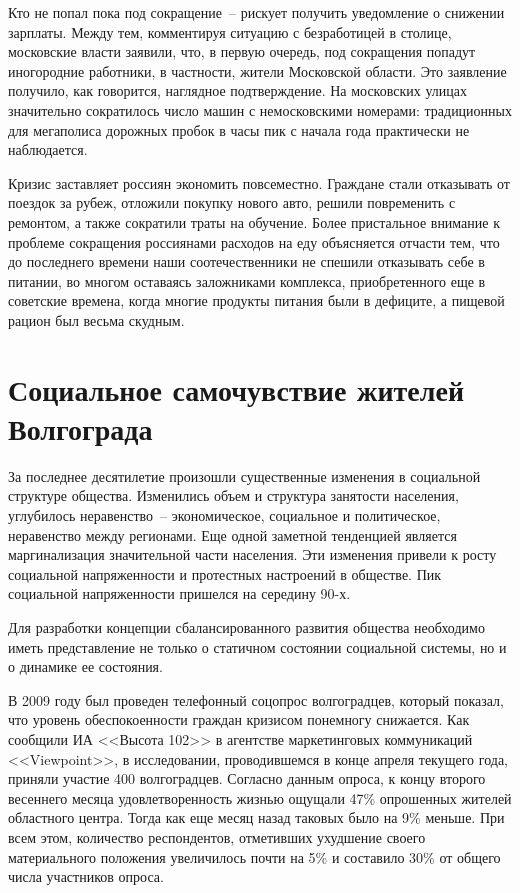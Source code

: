   Кто не попал пока под сокращение~-- рискует получить уведомление о снижении
  зарплаты. Между тем, комментируя ситуацию с безработицей в столице, московские
  власти заявили, что, в первую очередь, под сокращения попадут иногородние
  работники, в частности, жители Московской области. Это заявление получило, как
  говорится, наглядное подтверждение. На московских улицах значительно
  сократилось число машин с немосковскими номерами: традиционных для мегаполиса
  дорожных пробок в часы пик с начала года практически не наблюдается.
  
  Кризис заставляет россиян экономить повсеместно. Граждане стали отказывать от
  поездок за рубеж, отложили покупку нового авто, решили повременить с ремонтом,
  а также сократили траты на обучение. Более пристальное внимание к проблеме
  сокращения россиянами расходов на еду объясняется отчасти тем, что до
  последнего времени наши соотечественники не спешили отказывать себе в питании,
  во многом оставаясь заложниками комплекса, приобретенного еще в советские
  времена, когда многие продукты питания были в дефиците, а пищевой рацион был
  весьма скудным.
  
  \section{Социальное самочувствие жителей Волгограда}

  За последнее десятилетие произошли существенные изменения в социальной
  структуре общества. Изменились объем и структура занятости населения,
  углубилось неравенство~-- экономическое, социальное и политическое,
  неравенство между регионами. Еще одной заметной тенденцией является
  маргинализация значительной части населения. Эти изменения привели к росту
  социальной напряженности и протестных настроений в обществе. Пик социальной
  напряженности пришелся на середину 90-х.
    
  Для разработки концепции сбалансированного развития общества необходимо иметь
  представление не только о статичном состоянии социальной системы, но и о
  динамике ее состояния.
  
  В 2009 году был проведен телефонный соцопрос волгоградцев, который показал,
  что уровень обеспокоенности граждан кризисом понемногу снижается. Как сообщили
  ИА <<Высота 102>> в агентстве маркетинговых коммуникаций <<Viewpoint>>, в
  исследовании, проводившемся в конце апреля текущего года, приняли участие 400
  волгоградцев. Согласно данным опроса, к концу второго весеннего месяца
  удовлетворенность жизнью ощущали 47\% опрошенных жителей областного центра.
  Тогда как еще месяц назад таковых было на 9\% меньше. При всем этом,
  количество респондентов, отметивших ухудшение своего материального положения
  увеличилось почти на 5\% и составило 30\% от общего числа участников опроса.
  
